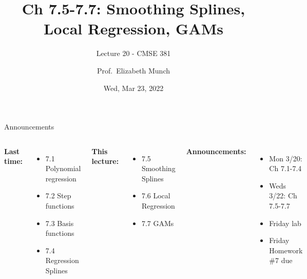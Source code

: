 \documentclass[aspectratio=169,usenames,dvipsnames]{beamer}
\begin{document}
\title[]{Ch 7.5-7.7: Smoothing Splines, Local Regression, GAMs}
\subtitle{Lecture 20 - CMSE 381}
\date{Wed, Mar 23, 2022}



\author[Dr.~Munch]{Prof.~Elizabeth Munch}

\begin{frame}
 \titlepage


\end{frame}
\begin{frame}[c]{Announcements}

\begin{columns}
\centering

	\textbf{Last time:}
	\begin{itemize}
		\item 7.1 Polynomial regression
		\item 7.2 Step functions
		\item 7.3 Basis functions
		\item 7.4 Regression Splines
	\end{itemize}

	\vspace{.2in}

	\textbf{This lecture:}
	\begin{itemize}
	\item 7.5 Smoothing Splines
	\item 7.6 Local Regression
	\item 7.7 GAMs
\end{itemize}


\centering

\textbf{Announcements:}
	\begin{itemize}
		\item Mon 3/20: Ch 7.1-7.4
		\item Weds 3/22: Ch 7.5-7.7
		\item Friday lab
		\item Friday Homework \#7 due

	\end{itemize}
\end{columns}

\end{frame}
\end{document}
